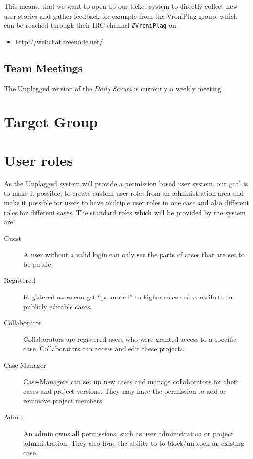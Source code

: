 This means, that we want to open up our ticket system to directly collect new user stories and gather feedback for 
example from the VroniPlag group, which can be reached through their IRC channel \texttt{\#VroniPlag} on:

\begin{itemize}
\item \url{http://webchat.freenode.net/}
\end{itemize} 


\subsection{Team Meetings}

The Unplagged version of the \textit{Daily Scrum} is currently a weekly meeting.


\section{Target Group}

\section{User roles}
As the Unplagged system will provide a permission based user system, our goal is to make it possible, to create custom user roles from an administration area and make it possible for users to have multiple user roles in one case and also different roles for different cases.
The standard roles which will be provided by the system are:

\begin{description}
\item[Guest]
A user without a valid login can only see the parts of cases that are set to be public.
\item[Registered]
Registered users can get \enquote{promoted} to higher roles and contribute to publicly editable cases.
\item[Collaborator]
Collaborators are registered users who were granted access to a specific case. Collaborators can access and edit these projects.
\item[Case-Manager]
Case-Managers can set up new cases and manage colloborators for their cases and project versions. They may have the permission to add or remmove project members.
\item[Admin]
An admin owns all permissions, such as user administration or project administration. They also hvae the ability to to block/unblock an existing case.
\end{description}

